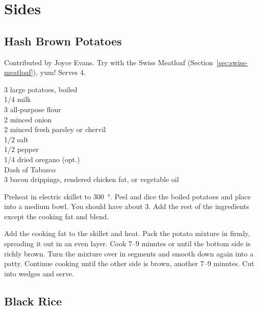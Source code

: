 \chapter{Sides}

\section{Hash Brown Potatoes}

\begin{open}
  Contributed by Joyce Evans. Try with the Swiss Meatloaf
  (Section~\ref{sec:swiss-meatloaf}), yum! Serves 4.
\end{open}
\begin{ingredients}
  3 large potatoes, boiled \\
  \SI{1/4}{\cup} milk \\
  \SI{3}{\tblspoon} all-purpose flour \\
  \SI{2}{\tblspoon} minced onion \\
  \SI{2}{\tblspoon} minced fresh parsley or chervil \\
  \SI{1/2}{\teaspoon} salt \\
  \SI{1/2}{\teaspoon} pepper \\
  \SI{1/4}{\teaspoon} dried oregano (opt.) \\
  Dash of Tabasco \\
  \SI{3}{\tblspoon} bacon drippings, rendered chicken fat, or vegetable oil
\end{ingredients}
Preheat in electric skillet to \SI{300}{\degree}. Peel and dice the boiled
potatoes and place into a medium bowl. You should have about \SI{3}{\cup}. Add
the rest of the ingredients except the cooking fat and blend.

Add the cooking fat to the skillet and heat. Pack the potato mixture in
firmly, spreading it out in an even layer. Cook \numrange{7}{9} minutes or
until the bottom side is richly brown. Turn the mixture over in segments and
smooth down again into a patty. Continue cooking until the other side is
brown, another \numrange{7}{9} minutes.  Cut into wedges and serve.

\section{Black Rice}

